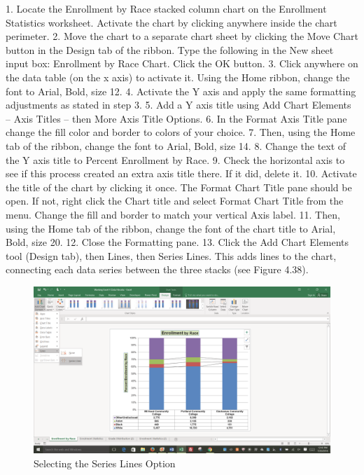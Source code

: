 1. Locate the Enrollment by Race stacked column chart on the Enrollment Statistics worksheet.
Activate the chart by clicking anywhere inside the chart perimeter.
2. Move the chart to a separate chart sheet by clicking the Move Chart button in the Design tab of
the ribbon. Type the following in the New sheet input box: Enrollment by Race Chart. Click
the OK button.
3. Click anywhere on the data table (on the x axis) to activate it. Using the Home ribbon, change
the font to Arial, Bold, size 12.
4. Activate the Y axis and apply the same formatting adjustments as stated in step 3.
5. Add a Y axis title using Add Chart Elements – Axis Titles – then More Axis Title Options.
6. In the Format Axis Title pane change the fill color and border to colors of your choice.
7. Then, using the Home tab of the ribbon, change the font to Arial, Bold, size 14.
8. Change the text of the Y axis title to Percent Enrollment by Race.
9. Check the horizontal axis to see if this process created an extra axis title there. If it did, delete it.
10. Activate the title of the chart by clicking it once. The Format Chart Title pane should be open.
If not, right click the Chart title and select Format Chart Title from the menu. Change
the fill and border to match your vertical Axis label.
11. Then, using the Home tab of the ribbon, change the font of the chart title to Arial, Bold, size 20.
12. Close the Formatting pane.
13. Click the Add Chart Elements tool (Design tab), then Lines, then Series Lines.
This adds lines to the chart, connecting each data series between the three stacks (see Figure
4.38).



\begin{figure}[H]
	\centering
	\includegraphics[width=\maxwidth{.95\linewidth}]{gfx/ch04_fig39}
	\caption{Selecting the Series Lines Option}
	\label{04:fig39}
\end{figure}

